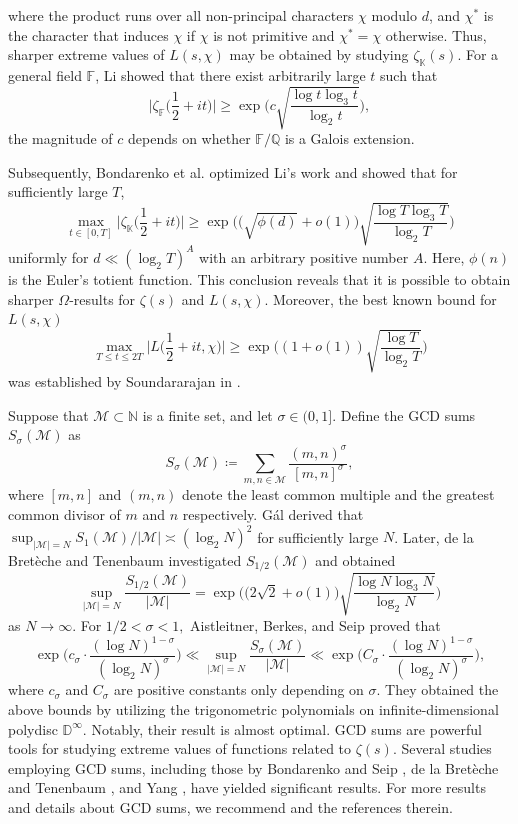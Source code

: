 \documentclass[12pt,reqno]{amsart}
\theoremstyle{definition}
\numberwithin{equation}{section}
\newcommand{\mbd}{\mathbb{D}}
\newcommand{\mbk}{\mathbb{K}}
\newcommand{\mbf}{\mathbb{F}}
\newcommand{\mbn}{\mathbb{N}}
\newcommand{\mbq}{\mathbb{Q}}
\newcommand{\mcm}{\mathcal{M}}
\begin{document}
where the product runs over all non-principal characters $\chi$ modulo $d$, and $\chi^{\ast}$ is the character that induces $\chi$ if $\chi$ is not primitive and $\chi^{\ast} = \chi$ otherwise. Thus, sharper extreme values of $L(s, \chi)$ may be obtained by studying $\zeta_\mbk(s)$. For a general field $\mbf$, Li \cite{li2018extreme} showed that there exist arbitrarily large $t$ such that
$$\Big|\zeta_\mbf\Big(\frac{1}{2}+i t\Big)\Big| \ge \exp \bigg(c \sqrt{\frac{\log t \log_3 t}{\log_2 t}}\bigg),$$
the magnitude of $c$ depends on whether $\mbf/\mbq$ is a Galois extension. 
\par
Subsequently, Bondarenko et al.  \cite{bondarenko2023dichotomy} optimized Li's work and showed that for sufficiently large $T$,
$$\max _{t \in[0, T]}\Big|\zeta_\mbk\Big(\frac{1}{2}+i t\Big)\Big| \ge \exp \bigg(\Big(\sqrt{\phi(d)} +o(1)\Big) \sqrt{\frac{\log T \log_3 T}{\log_2T}}\bigg)$$
uniformly for $d \ll (\log_2T)^A$ with an arbitrary positive number $A.$ Here, $\phi(n)$ is the Euler's totient function. This conclusion reveals that it is possible to obtain sharper $\Omega$-results for
$\zeta(s)$ and $L(s,\chi)$. Moreover, the best known bound for $L(s, \chi)$
$$
\max _{T \le t \le 2T}\Big| L\Big(\frac{1}{2} + i t, \chi \Big)\Big| \ge \exp \bigg((1+o(1)) \sqrt{\frac{\log T}{\log_2 T}}\bigg)
$$
was established by Soundararajan in \cite{soundararajan2008extreme}. 
\par
Suppose that $\mcm \subset \mbn$ is a finite set, and let $\sigma \in (0, 1].$ Define the GCD sums $S_{\sigma}(\mcm)$ as 
$$
S_{\sigma}(\mcm) \coloneqq \sum_{m,n\in\mcm} \frac{(m,n)^{\sigma}}{[m,n]^{\sigma}},
$$
where $[m,n]$ and $(m,n)$ denote the least common multiple and the greatest common divisor of $m$ and $n$ respectively. G{\'a}l \cite{gal1949theorem} derived that $\sup_{|\mcm| = N} S_1(\mcm)/|\mcm| \asymp (\log_2 N)^2$ for sufficiently large $N$.
Later, de la Bretèche and Tenenbaum \cite{tenen2019galsum} investigated $S_{1/2}(\mcm)$ and obtained 
$$\sup_{|\mcm| = N} \frac{S_{1/2}(\mcm)}{|\mcm|} = \exp\bigg( \Big(2\sqrt{2} + o(1)\Big) \sqrt{\frac{\log N \log_3 N}{\log_2 N}} \bigg)$$
as $N \to \infty$. For $1/2 < \sigma < 1,$ Aistleitner, Berkes, and Seip \cite{aistleitner2015gcd} proved that
$$
\exp\bigg(c_{\sigma}\cdot\frac{(\log N)^{1 - \sigma}}{(\log_2 N)^{\sigma}}\bigg) \ll \sup_{|\mcm| = N}\frac{S_{\sigma}(\mcm)}{|\mcm|} \ll \exp\bigg(C_{\sigma}\cdot\frac{(\log N)^{1 - \sigma}}{(\log_2 N)^{\sigma}}\bigg),
$$
where $c_{\sigma}$ and $C_{\sigma}$ are positive constants only depending on $\sigma$. They obtained the above bounds by utilizing the trigonometric polynomials on infinite-dimensional polydisc $\mbd^{\infty}$. Notably, their result is almost optimal. GCD sums are powerful tools for studying extreme values of functions related to $\zeta(s)$. Several studies employing GCD sums, including those by Bondarenko and Seip \cite{bondarenko2017large}, de la Bretèche and Tenenbaum \cite{tenen2019galsum}, and Yang \cite{yang2022extreme}, have yielded significant results. For more results and details about GCD sums, we recommend \cite{bondarenko2016gal,bondarenko2015gcd,bondarenko2018note,dong2021large,lewko2017refinements,yang2022note} and the references therein.
\end{document}
